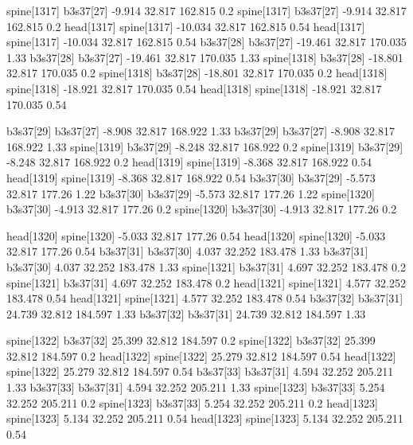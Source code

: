 spine[1317]    b3s37[27]    -9.914    32.817    162.815    0.2
spine[1317]    b3s37[27]    -9.914    32.817    162.815    0.2
head[1317]    spine[1317]    -10.034    32.817    162.815    0.54
head[1317]    spine[1317]    -10.034    32.817    162.815    0.54
b3s37[28]    b3s37[27]    -19.461    32.817    170.035    1.33
b3s37[28]    b3s37[27]    -19.461    32.817    170.035    1.33
spine[1318]    b3s37[28]    -18.801    32.817    170.035    0.2
spine[1318]    b3s37[28]    -18.801    32.817    170.035    0.2
head[1318]    spine[1318]    -18.921    32.817    170.035    0.54
head[1318]    spine[1318]    -18.921    32.817    170.035    0.54


b3s37[29]    b3s37[27]    -8.908    32.817    168.922    1.33
b3s37[29]    b3s37[27]    -8.908    32.817    168.922    1.33
spine[1319]    b3s37[29]    -8.248    32.817    168.922    0.2
spine[1319]    b3s37[29]    -8.248    32.817    168.922    0.2
head[1319]    spine[1319]    -8.368    32.817    168.922    0.54
head[1319]    spine[1319]    -8.368    32.817    168.922    0.54
b3s37[30]    b3s37[29]    -5.573    32.817    177.26    1.22
b3s37[30]    b3s37[29]    -5.573    32.817    177.26    1.22
spine[1320]    b3s37[30]    -4.913    32.817    177.26    0.2
spine[1320]    b3s37[30]    -4.913    32.817    177.26    0.2


head[1320]    spine[1320]    -5.033    32.817    177.26    0.54
head[1320]    spine[1320]    -5.033    32.817    177.26    0.54
b3s37[31]    b3s37[30]    4.037    32.252    183.478    1.33
b3s37[31]    b3s37[30]    4.037    32.252    183.478    1.33
spine[1321]    b3s37[31]    4.697    32.252    183.478    0.2
spine[1321]    b3s37[31]    4.697    32.252    183.478    0.2
head[1321]    spine[1321]    4.577    32.252    183.478    0.54
head[1321]    spine[1321]    4.577    32.252    183.478    0.54
b3s37[32]    b3s37[31]    24.739    32.812    184.597    1.33
b3s37[32]    b3s37[31]    24.739    32.812    184.597    1.33


spine[1322]    b3s37[32]    25.399    32.812    184.597    0.2
spine[1322]    b3s37[32]    25.399    32.812    184.597    0.2
head[1322]    spine[1322]    25.279    32.812    184.597    0.54
head[1322]    spine[1322]    25.279    32.812    184.597    0.54
b3s37[33]    b3s37[31]    4.594    32.252    205.211    1.33
b3s37[33]    b3s37[31]    4.594    32.252    205.211    1.33
spine[1323]    b3s37[33]    5.254    32.252    205.211    0.2
spine[1323]    b3s37[33]    5.254    32.252    205.211    0.2
head[1323]    spine[1323]    5.134    32.252    205.211    0.54
head[1323]    spine[1323]    5.134    32.252    205.211    0.54


